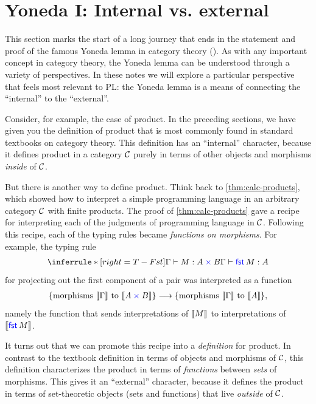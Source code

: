 \chapter{Yoneda I: Internal vs. external}

This section marks the start of a long journey that ends in
the statement and proof of the famous Yoneda lemma in category theory (\todo).
As with any important concept in category theory, the Yoneda lemma
can be understood through a variety of perspectives. In these
notes we will explore a particular perspective that feels most
relevant to PL: the Yoneda lemma is a means of connecting
the ``internal'' to the ``external''.

Consider, for example, the case of product.
In the preceding sections, we have given you the definition of product
that is most commonly found in standard textbooks on category theory.
This definition has an ``internal'' character, because it defines
product in a category \(\mathcal C\) purely in terms of
other objects and morphisms \emph{inside} of \(\mathcal C\).

But there is another way to define product.
Think back to \cref{thm:calc-products},
which showed how to interpret a simple programming language
in an arbitrary category \(\mathcal C\) with finite products.
The proof of \cref{thm:calc-products} gave a recipe
for interpreting each of the judgments of programming language
in \(\mathcal C\). Following this recipe,
each of the typing rules became
\emph{functions on morphisms}. For example, the typing rule
\[
\inferrule*[right=T-Fst]{\Gamma \vdash M : A \pltimes B}{\Gamma \vdash \plfst{M} : A}
\]
for projecting out the first component of a pair
was interpreted as a function
\begin{align*}
  \{\text{morphisms \(\left\llbracket \Gamma\right\rrbracket\) to \(\left\llbracket A\mathbin{{\color{blue}\times}}B\right\rrbracket\)}\}
  \longrightarrow
  \{\text{morphisms \(\left\llbracket \Gamma\right\rrbracket\) to \(\left\llbracket A\right\rrbracket\)} \},
\end{align*}
namely the function
that sends interpretations of \(\left\llbracket M\right\rrbracket\) to interpretations of \(\left\llbracket \mathsf{{\color{blue}fst}}\,M\right\rrbracket\).

It turns out that we can promote this recipe into a \emph{definition} for product.
In contrast to the textbook definition in terms of objects and morphisms
of \(\mathcal C\), this definition characterizes the product in terms of \emph{functions} between
\emph{sets} of morphisms. This gives it an ``external'' character,
because it defines the product in terms of set-theoretic objects (sets and functions)
that live \emph{outside} of \(\mathcal C\).

